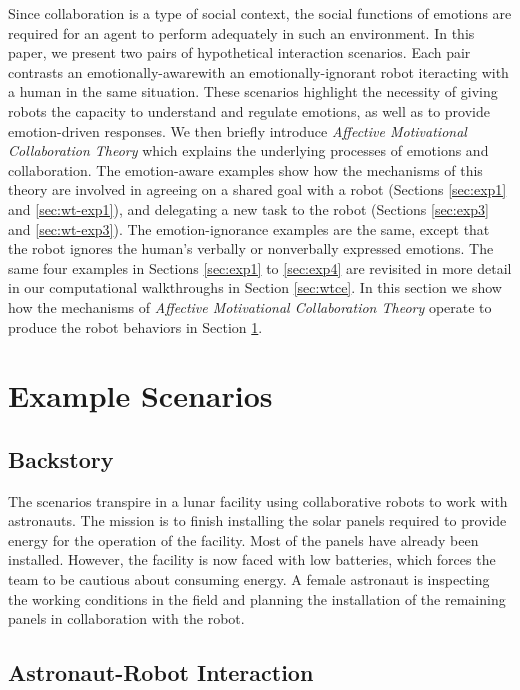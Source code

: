 Since collaboration is a type of social context, the social functions of
emotions are required for an agent to perform adequately in such an environment.
In this paper, we present two pairs of hypothetical interaction scenarios. Each
pair contrasts an emotionally-awarewith an emotionally-ignorant robot iteracting
with a human in the same situation. These scenarios highlight the necessity of
giving robots the capacity to understand and regulate emotions, as well as to
provide emotion-driven responses. We then briefly introduce \textit{Affective
Motivational Collaboration Theory} which explains the underlying processes of
emotions and collaboration. The emotion-aware examples show how the mechanisms
of this theory are involved in agreeing on a shared goal with a robot (Sections
\ref{sec:exp1} and \ref{sec:wt-exp1}), and delegating a new task to the robot
(Sections \ref{sec:exp3} and \ref{sec:wt-exp3}). The emotion-ignorance examples
are the same, except that the robot ignores the human's verbally or nonverbally
expressed emotions. The same four examples in Sections \ref{sec:exp1} to
\ref{sec:exp4} are revisited in more detail in our computational walkthroughs
in Section \ref{sec:wtce}. In this section we show how the mechanisms of
\textit{Affective Motivational Collaboration Theory} operate to produce the
robot behaviors in Section \ref{sec:example-scenario}.

\section{Example Scenarios}
\label{sec:example-scenario}

\subsection{Backstory}

The scenarios transpire in a lunar facility using collaborative robots to work
with astronauts. The mission is to finish installing the solar panels required
to provide energy for the operation of the facility. Most of the panels have
already been installed. However, the facility is now faced with low batteries,
which forces the team to be cautious about consuming energy. A female astronaut
is inspecting the working conditions in the field and planning the installation
of the remaining panels in collaboration with the robot.

\subsection{Astronaut-Robot Interaction}

